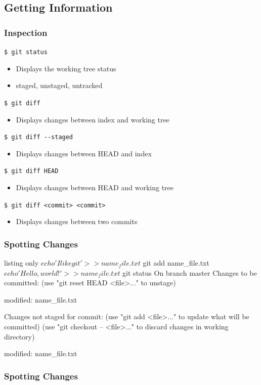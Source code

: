 \documentclass[english,compress]{beamer}
\begin{document}
\subsection{Getting Information}
\begin{frame}[fragile]
    \frametitle{Inspection}

    \verb|$ git status|
    \begin{itemize}
        \item Displays the working tree status
        \item staged, unstaged, untracked
    \end{itemize}
    \verb|$ git diff|
    \begin{itemize}
        \item Displays changes between index and working tree
    \end{itemize}
    \verb|$ git diff --staged|
    \begin{itemize}
        \item Displays changes between HEAD and index
    \end{itemize}
    \verb|$ git diff HEAD|
    \begin{itemize}
        \item Displays changes between HEAD and working tree
    \end{itemize}
    \verb|$ git diff <commit> <commit>|
    \begin{itemize}
        \item Displays changes between two commits
    \end{itemize}
\end{frame}

\begin{frame}[fragile]
    \frametitle{Spotting Changes}
    \begin{tcblisting}{listing only}
$ echo 'I like git' >> name_file.txt
$ git add name_file.txt 
$ echo 'Hello, world!' >> name_file.txt
$ git status
On branch master
Changes to be committed:
  (use "git reset HEAD <file>..." to unstage)

	modified:   name_file.txt

Changes not staged for commit:
  (use "git add <file>..." to update what will be committed)
  (use "git checkout -- <file>..." to discard changes in working directory)

	modified:   name_file.txt
    \end{tcblisting}
\end{frame}

\begin{frame}[fragile]
    \frametitle{Spotting Changes}
\end{frame}
\end{document}
